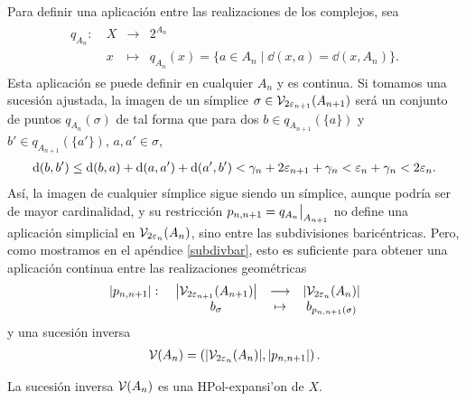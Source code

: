 \fi

Para definir una aplicación entre las realizaciones de los complejos, sea
\begin{gather*}
  \begin{matrix}
  q_{A_n }: \ &X  &\longrightarrow &2^{A_n}  \\
  &x  &\mapsto &q_{A_n}(x) = \{a\in A_n \mid \dd(x,a) = \dd (x,A_n )\}.
  \end{matrix}
\end{gather*}
Esta aplicación se puede definir en cualquier $ A_n  $ y es continua. Si tomamos una sucesión ajustada, la imagen de un símplice $ \sigma \in \mathcal{V}_{2\varepsilon_{n+1}}(A_{n+1} ) $ será un conjunto de puntos $ q_{A_n}(\sigma) $ de tal forma que para dos $ b \in q_{A_{n+1}}(\{a \} ) $ y $ b'\in q_{A_{n+1}}(\{a'\}) $, $a,a'\in \sigma $,
\begin{gather*}
  \dd (b,b' ) \leq \dd (b,a )+\dd(a,a')+\dd(a',b') <\gamma_n +2\varepsilon_{n+1}+\gamma_n < \varepsilon_n +\gamma_n <2\varepsilon_n.
\end{gather*}
Así, la imagen de cualquier símplice sigue siendo un símplice, aunque podría ser de mayor cardinalidad, y su restricción $p_{n,n+1} =  \rest{q_{A_n }}{A_{n+1}} $ no define una aplicación simplicial en $ \mathcal{V}_{2\varepsilon_n}(A_{n}) $, sino entre las subdivisiones baricéntricas. Pero, como mostramos en el apéndice \ref{subdivbar}, esto es suficiente para obtener una aplicación continua entre las realizaciones geométricas
\begin{gather*}
  \begin{matrix}
  \abs{p_{n,n+1}}: \ &\abs{\mathcal{V}_{2\varepsilon_{n+1}}(A_{n+1})} &\longrightarrow &\abs{\mathcal{V}_{2\varepsilon_n }(A_n )} \\
  &b_{\sigma} &\mapsto &b_{p_{n,n+1}(\sigma)}
  \end{matrix}
\end{gather*}
y una sucesión inversa 
\begin{gather*}
  \mathcal{V}(A_n )  = \left(\abs{\mathcal{V}_{2\varepsilon_n }(A_n)},\abs{p_{n,n+1 }}\right). 
\end{gather*}
\begin{theorem}
La sucesión inversa $ \mathcal{V}(A_n ) $ es una HPol-expansi'on de $X$.
\end{theorem}

